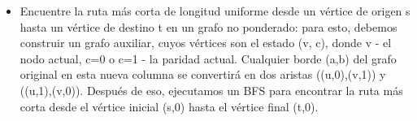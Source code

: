 \begin{itemize}
	\item Encuentre la ruta más corta de longitud uniforme desde un vértice de origen s hasta un vértice de destino t en un grafo no ponderado: para esto, debemos construir un grafo auxiliar, cuyos vértices son el estado (v, c), donde v - el nodo actual, c=0 o c=1 - la paridad actual. Cualquier borde (a,b) del grafo original en esta nueva columna se convertirá en dos aristas ((u,0),(v,1)) y ((u,1),(v,0)). Después de eso, ejecutamos un BFS para encontrar la ruta más corta desde el vértice inicial (s,0) hasta el vértice final (t,0).
\end{itemize}